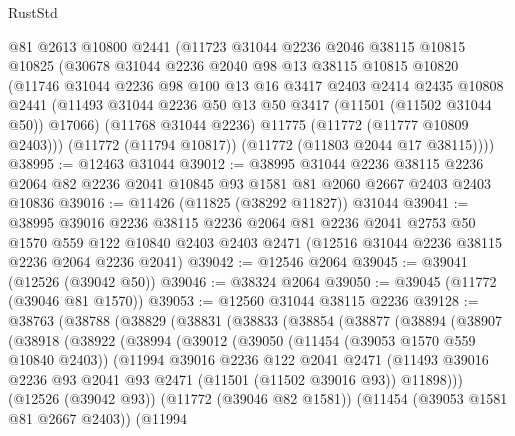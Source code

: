 \begin{lexlean}{RustStd}
\begin{coremodule}
    @81
    @2613
    @10800
    @2441
    (@11723
      @31044
      @2236
      @2046
      @38115
      @10815
      @10825
      (@30678
        @31044
        @2236
        @2040
        @98
        @13
        @38115
        @10815
        @10820
        (@11746
          @31044
          @2236
          @98
          @100
          @13
          @16
          @3417
          @2403
          @2414
          @2435
          @10808
          @2441
          (@11493 @31044 @2236 @50 @13 @50 @3417 (@11501 (@11502 @31044 @50)) @17066)
          (@11768 @31044 @2236)
          @11775
          (@11772 (@11777 @10809 @2403)))
        (@11772 (@11794 @10817))
        (@11772 (@11803 @2044 @17 @38115))))
@38995 := @12463 @31044
@39012 := @38995
    @31044
    @2236
    @38115
    @2236
    @2064
    @82
    @2236
    @2041
    @10845
    @93
    @1581
    @81
    @2060
    @2667
    @2403
    @2403
    @10836
@39016 := @11426 (@11825 (@38292 @11827)) @31044
@39041 := @38995
    @39016
    @2236
    @38115
    @2236
    @2064
    @81
    @2236
    @2041
    @2753
    @50
    @1570
    @559
    @122
    @10840
    @2403
    @2403
    @2471
    (@12516 @31044 @2236 @38115 @2236 @2064 @2236 @2041)
@39042 := @12546 @2064
@39045 := @39041 (@12526 (@39042 @50))
@39046 := @38324 @2064
@39050 := @39045 (@11772 (@39046 @81 @1570))
@39053 := @12560 @31044 @38115 @2236
@39128 := @38763
    (@38788
      (@38829
        (@38831
          (@38833
            (@38854
              (@38877
                (@38894
                  (@38907
                    (@38918
                      (@38922
                        (@38994
                          (@39012
                            (@39050
                              (@11454 (@39053 @1570 @559 @10840 @2403))
                              (@11994
                                @39016
                                @2236
                                @122
                                @2041
                                @2471
                                (@11493
                                  @39016
                                  @2236
                                  @93
                                  @2041
                                  @93
                                  @2471
                                  (@11501 (@11502 @39016 @93))
                                  @11898)))
                            (@12526 (@39042 @93))
                            (@11772 (@39046 @82 @1581))
                            (@11454 (@39053 @1581 @81 @2667 @2403))
                            (@11994

\end{coremodule}
\end{lexlean}
